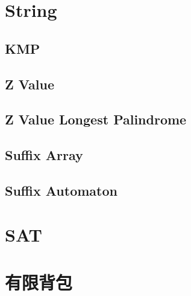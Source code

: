\documentclass[10pt,twocolumn,oneside]{article}
\begin{document}
    \section{String}
    \subsection{KMP}
    
    \subsection{Z Value}
    
    \subsection{Z Value Longest Palindrome}
    
    \subsection{Suffix Array}
    
    \subsection{Suffix Automaton}
    
    \section{SAT}
    
    \section{有限背包}
    

	\newpage

    
\end{document}
